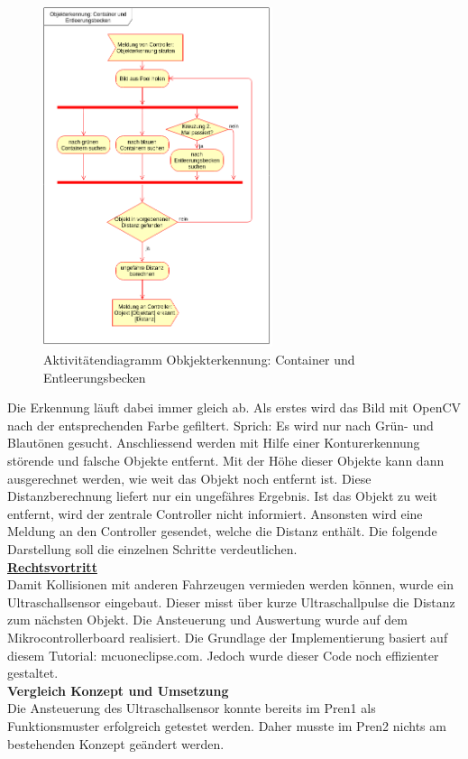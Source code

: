 \begin{figure}[H]%
\centering
\includegraphics[width=0.6\textwidth]{03_Loesungskonzept/pictures/objekterkennung_containers.png}
\caption{Aktivitätendiagramm Obkjekterkennung: Container und Entleerungsbecken}
\label{fig:activityContainer}
\end{figure}
\newpage
Die Erkennung läuft dabei immer gleich ab. Als erstes wird das Bild mit OpenCV nach der entsprechenden Farbe gefiltert. Sprich: Es wird nur nach Grün- und Blautönen gesucht. Anschliessend werden mit Hilfe einer Konturerkennung störende und falsche Objekte entfernt. Mit der Höhe dieser Objekte kann dann ausgerechnet werden, wie weit das Objekt  noch entfernt ist. Diese Distanzberechnung liefert nur ein ungefähres Ergebnis. Ist das Objekt zu weit entfernt, wird der zentrale Controller nicht informiert. Ansonsten wird eine Meldung an den Controller gesendet, welche die Distanz enthält. Die folgende Darstellung soll die einzelnen Schritte verdeutlichen.
\\[0.2cm]
\underline{\textbf{Rechtsvortritt}}\\[0.2cm]
Damit Kollisionen mit anderen Fahrzeugen vermieden werden können, wurde ein Ultraschallsensor eingebaut. Dieser misst über kurze Ultraschallpulse die Distanz zum nächsten Objekt. Die Ansteuerung und Auswertung wurde auf dem Mikrocontrollerboard realisiert. Die Grundlage der Implementierung basiert auf diesem Tutorial: mcuoneclipse.com. Jedoch wurde dieser Code noch effizienter gestaltet.\\[0.2cm]
\textbf{Vergleich Konzept und Umsetzung}\\[0.2cm]
Die Ansteuerung des Ultraschallsensor konnte bereits im Pren1 als Funktionsmuster erfolgreich getestet werden. Daher musste im Pren2 nichts am bestehenden Konzept geändert werden.


